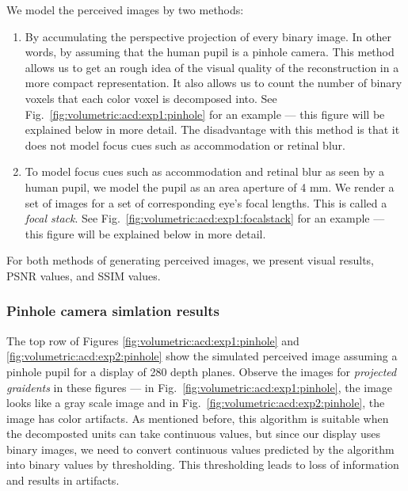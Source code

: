 We model the perceived images by two methods:
\begin{enumerate}
\item By accumulating the perspective projection of every binary image. In other words, by assuming that the human pupil is a pinhole camera. This method allows us to get an rough idea of the visual quality of the reconstruction in a more compact representation. It also allows us to count the number of binary voxels that each color voxel is decomposed into. See Fig.~\ref{fig:volumetric:acd:exp1:pinhole} for an example --- this figure will be explained below in more detail. The disadvantage with this method is that it does not model focus cues such as accommodation or retinal blur.
\item To model focus cues such as accommodation and retinal blur as seen by a human pupil, we model the pupil as an area aperture of 4 mm. We render a set of images for a set of corresponding eye's focal lengths. This is called a \emph{focal stack}. See Fig.~\ref{fig:volumetric:acd:exp1:focalstack} for an example --- this figure will be explained below in more detail.
\end{enumerate}

For both methods of generating perceived images, we present visual results, PSNR values, and SSIM values. 

\subsubsection{Pinhole camera simlation results}





The top row of Figures \ref{fig:volumetric:acd:exp1:pinhole} and \ref{fig:volumetric:acd:exp2:pinhole} show the simulated perceived image assuming a pinhole pupil for a display of 280 depth planes. Observe the images for \emph{projected graidents} in these figures --- in Fig.~\ref{fig:volumetric:acd:exp1:pinhole}, the image looks like a gray scale image and in Fig.~\ref{fig:volumetric:acd:exp2:pinhole}, the image has color artifacts. As mentioned before, this algorithm is suitable when the decomposted units can take continuous values, but since our display uses binary images, we need to convert continuous values predicted by the algorithm into binary values by thresholding. This thresholding leads to loss of information and results in artifacts. 

